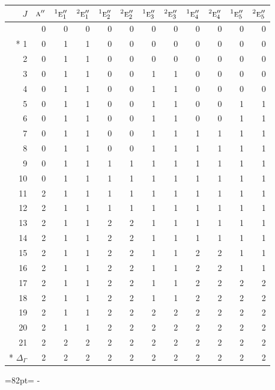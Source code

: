 \documentclass[10pt,a4paper]{article}
\makeatletter
\def\grouprule#1#2{\noalign{\marks\LTgroupmarks{\the\belowrulesep}\nobreak\vskip#1%
  \vskip\aboverulesep}\multispan\LT@cols\unskip{\leaders\hrule\@height#2\hfill\kern\z@}\cr
  \noalign{\penalty\LTrulebreak\vskip\belowrulesep\global\@lastruleclass\z@}}
\newcommand{\needspace}[1]{\par\penalty-100\begingroup\dimen0=#1\relax\dimen2=\pagegoal
  \advance\dimen2-\pagetotal\ifdim\dimen0>\dimen2\relax\ifdim\dimen2>0pt\vfil\break\fi\fi
  \endgroup}
\numberwithin{equation}{section}
\newcommand{\irr}[1]{\text{\normalfont\scshape #1}}
\newcommand{\conjpair}[1]{{}^{#1}}
\makeatother
\begin{document}
{\small\begin{longtable}{@{}rrrrrrrrrrrr@{}}\toprule
$J$ & $\irr{a}''$ & $\conjpair{1}\irr{e}_{1}''$ & $\conjpair{2}\irr{e}_{1}''$ & $\conjpair{1}\irr{e}_{2}''$ & $\conjpair{2}\irr{e}_{2}''$ & $\conjpair{1}\irr{e}_{3}''$ & $\conjpair{2}\irr{e}_{3}''$ & $\conjpair{1}\irr{e}_{4}''$ & $\conjpair{2}\irr{e}_{4}''$ & $\conjpair{1}\irr{e}_{5}''$ & $\conjpair{2}\irr{e}_{5}''$\\\midrule\endhead
\bottomrule\endfoot\endlastfoot
0 & 0 & 0 & 0 & 0 & 0 & 0 & 0 & 0 & 0 & 0 & 0\\*
1 & 0 & 1 & 1 & 0 & 0 & 0 & 0 & 0 & 0 & 0 & 0\\
2 & 0 & 1 & 1 & 0 & 0 & 0 & 0 & 0 & 0 & 0 & 0\\
3 & 0 & 1 & 1 & 0 & 0 & 1 & 1 & 0 & 0 & 0 & 0\\
4 & 0 & 1 & 1 & 0 & 0 & 1 & 1 & 0 & 0 & 0 & 0\\
5 & 0 & 1 & 1 & 0 & 0 & 1 & 1 & 0 & 0 & 1 & 1\\
6 & 0 & 1 & 1 & 0 & 0 & 1 & 1 & 0 & 0 & 1 & 1\\
7 & 0 & 1 & 1 & 0 & 0 & 1 & 1 & 1 & 1 & 1 & 1\\
8 & 0 & 1 & 1 & 0 & 0 & 1 & 1 & 1 & 1 & 1 & 1\\
9 & 0 & 1 & 1 & 1 & 1 & 1 & 1 & 1 & 1 & 1 & 1\\
10 & 0 & 1 & 1 & 1 & 1 & 1 & 1 & 1 & 1 & 1 & 1\\
11 & 2 & 1 & 1 & 1 & 1 & 1 & 1 & 1 & 1 & 1 & 1\\
12 & 2 & 1 & 1 & 1 & 1 & 1 & 1 & 1 & 1 & 1 & 1\\
13 & 2 & 1 & 1 & 2 & 2 & 1 & 1 & 1 & 1 & 1 & 1\\
14 & 2 & 1 & 1 & 2 & 2 & 1 & 1 & 1 & 1 & 1 & 1\\
15 & 2 & 1 & 1 & 2 & 2 & 1 & 1 & 2 & 2 & 1 & 1\\
16 & 2 & 1 & 1 & 2 & 2 & 1 & 1 & 2 & 2 & 1 & 1\\
17 & 2 & 1 & 1 & 2 & 2 & 1 & 1 & 2 & 2 & 2 & 2\\
18 & 2 & 1 & 1 & 2 & 2 & 1 & 1 & 2 & 2 & 2 & 2\\
19 & 2 & 1 & 1 & 2 & 2 & 2 & 2 & 2 & 2 & 2 & 2\\
20 & 2 & 1 & 1 & 2 & 2 & 2 & 2 & 2 & 2 & 2 & 2\\
21 & 2 & 2 & 2 & 2 & 2 & 2 & 2 & 2 & 2 & 2 & 2\\*
\grouprule{0pt}{\lightrulewidth} $\Delta_\Gamma$ & 2 & 2 & 2 & 2 & 2 & 2 & 2 & 2 & 2 & 2 & 2\\
\bottomrule\end{longtable}}
\needspace{82pt}
\end{document}
